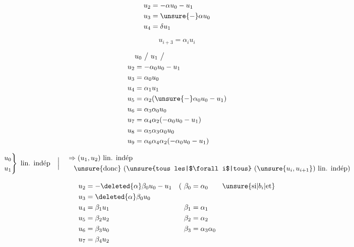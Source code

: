 
\[
\begin{aligned}
u_2&=-\alpha u_0-u_1\\u_3&=\unsure{-}\alpha u_0\\u_4&=\delta u_1
\end{aligned}
\]

\[
u_{i+3}=\alpha_i u_i
\]


\[
\begin{aligned}
&u_0\ \big/\ u_1\ \big/\\
u_2&=-\alpha_0u_0-u_1\\
u_3&=\alpha_0u_0\\
u_4&=\alpha_1u_1\\
u_5&=\alpha_2(\unsure{-}\alpha_0u_0-u_1)\\
u_6&=\alpha_3\alpha_0u_0\\
u_7&=\alpha_4\alpha_2(-\alpha_0u_0-u_1)\\
u_8&=\alpha_5\alpha_3\alpha_0u_0\\
u_9&=\alpha_6\alpha_4\alpha_2(-\alpha_0u_0-u_1)
\end{aligned}
\]

\margin{$=$}

\[
\left.\begin{aligned}u_0\\u_1\end{aligned}\right\}\ \text{lin. indép}
\quad\Big|\quad
\begin{aligned}
&\Rightarrow (u_1,u_2)\ \text{lin. indép}\\
&\quad\text{\unsure{donc} (\unsure{tous les|$\forall i$|tous} $(\unsure{u_i,u_{i+1}})$ lin. indép)}
\end{aligned}
\]

\[
\begin{aligned}
u_2&=-\deleted{\alpha}\beta_0u_0-u_1 &(\ \beta_0&=\alpha_0\qquad\unsure{\text{si}|b_i|\text{et}}\\
u_3&=\deleted{\alpha}\beta_0u_0\\
u_4&=\beta_1u_1 &\beta_{1}&=\alpha_1\\
u_5&=\beta_2u_2 &\beta_2&=\alpha_2\\
u_6&=\beta_3u_0 &\beta_3&=\alpha_3\alpha_0\\
u_7&=\beta_4u_2
\end{aligned}
\]

